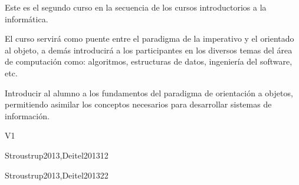 \begin{syllabus}


\begin{justification}
Este es el segundo curso en la secuencia de los cursos introductorios a la informática.

El curso servirá como puente entre el paradigma de la imperativo y el orientado al objeto, a demás introducirá a los participantes en los diversos temas del área de computación como: algoritmos, estructuras de datos, ingeniería del software, etc.
\end{justification}

\begin{goals}
\item Introducir al alumno a los fundamentos del paradigma de
      orientación a objetos, permitiendo asimilar los conceptos
      necesarios para desarrollar  sistemas de información.
\end{goals}

\begin{outcomes}{V1}
\item {}
\item {}
\item {}
\item {}
\item {}
\item {}
\end{outcomes}

\begin{unit}{\SDFFundamentalProgrammingConcepts}{}{Stroustrup2013,Deitel2013}{1}{2}
   \SDFFundamentalProgrammingConceptsAllTopics

   \SDFFundamentalProgrammingConceptsAllLearningOutcomes
\end{unit}

\begin{unit}{\OSVirtualMachines}{}{Stroustrup2013,Deitel2013}{2}{2}
   \OSVirtualMachinesAllTopics
   
   \OSVirtualMachinesAllLearningOutcomes
\end{unit}

\begin{coursebibliography}
\end{coursebibliography}

\end{syllabus}
